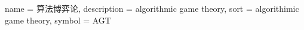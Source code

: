 {
	name = 算法博弈论,
	description = {algorithmic game theory},
	sort = {algorithimic game theory},
	symbol = {AGT}
}
